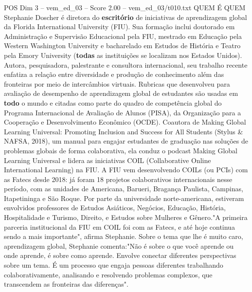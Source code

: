 \begin{textsample}{POS Dim 3 – vem\_ed\_03 – Score 2.00 – vem\_ed\_03/t010.txt}  \label{ex:f3_pos_015}
QUEM É QUEM Stephanie Doscher é diretora do \textbf{escritório} de iniciativas de aprendizagem global da Florida International University (FIU).
Sua formação inclui doutorado em Administração e Supervisão Educacional pela FIU, mestrado em Educação pela Western Washington University e bacharelado em Estudos de História e Teatro pela Emory University (\textbf{todas} as instituições se localizam nos Estados Unidos).
Autora, pesquisadora, palestrante e consultora internacional, seu trabalho recente enfatiza a relação entre diversidade e produção de conhecimento além das fronteiras por meio de intercâmbios virtuais.
Rubricas que desenvolveu para avaliação de desempenho de aprendizagem global de estudantes são usadas em \textbf{todo} o mundo e citadas como parte do quadro de competência global do Programa Internacional de Avaliação de Alunos (PISA), da Organização para a Cooperação e Desenvolvimento Econômico (OCDE).
Coautora de Making Global Learning Universal: Promoting Inclusion and Success for All Students (Stylus \& NAFSA, 2018), um manual para engajar estudantes de graduação nas soluções de problemas globais de forma colaborativa, ela conduz o podcast Making Global Learning Universal e lidera as iniciativas COIL (Collaborative Online International Learning) na FIU.
A FIU vem desenvolvendo COILs (ou PCIs) com as Fatecs desde 2018: já foram 18 projetos colaborativos internacionais nesse período, com as unidades de Americana, Barueri, Bragança Paulista, Campinas, Itapetininga e São Roque.
Por parte da universidade norte-americana, estiveram envolvidos professores de Estudos Asiáticos, Negócios, Educação, História, Hospitalidade e Turismo, Direito, e Estudos sobre Mulheres e Gênero."A primeira parceria institucional da FIU em COIL foi com as Fatecs, e até hoje continua sendo a mais importante", afirma Stephanie.
Sobre o tema que lhe é muito caro, aprendizagem global, Stephanie comenta:"Não é sobre o que você aprende ou onde aprende, é sobre como aprende.
Envolve conectar diferentes perspectivas sobre um tema.
É um processo que engaja pessoas diferentes trabalhando colaborativamente, analisando e resolvendo problemas complexos, que transcendem as fronteiras das diferenças".

\end{textsample}
